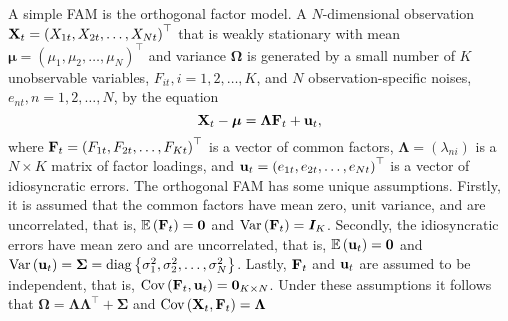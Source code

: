 A simple FAM is the orthogonal factor model. A $N$-dimensional observation ${\bf X}_t = \left( X_{1 t}, X_{2 t}, \ldots, X_{N t} \right)^{\top}$ that is weakly stationary with mean ${\bm \mu} = \left( \mu_1, \mu_2, \ldots, \mu_N \right)^{\top}$ and variance ${\bm \Omega}$ is generated by a small number of $K$ unobservable variables, $F_{i t}, i = 1, 2, \ldots, K$, and $N$ observation-specific noises, $e_{n t}, n = 1, 2, \ldots, N$, by the equation
\begin{equation}
	{\bf X}_t - {\bm \mu} = {\bm \Lambda} {\bf F}_t + {\bf u}_t \label{orthog.fa.model},
\end{equation}
where ${\bf F}_t = \left( F_{1 t}, F_{2 t}, \ldots, F_{K t} \right)^{\top}$ is a vector of common factors, ${\bm \Lambda} = \left( \lambda_{n i} \right)$ is a $N \times K$ matrix of factor loadings, and ${\bf u}_t = \left( e_{1 t}, e_{2 t}, \ldots, e_{N t} \right)^{\top}$ is a vector of idiosyncratic errors. 
The orthogonal FAM has some unique assumptions.
Firstly, it is assumed that the common factors have mean zero, unit variance, and are uncorrelated, that is, $\mathbb{E} \left( {\bf F}_t \right) = {\bm 0}$ and $\text{Var} \left( {\bf F}_t \right) = {\bm I}_K$.
Secondly, the idiosyncratic errors have mean zero and are uncorrelated, that is,  $\mathbb{E} \left( {\bf u}_t \right) = {\bm 0}$ and $\text{Var} \left( {\bf u}_t \right) = {\bm \Sigma} = \operatorname{diag} \left\{ \sigma_1^2, \sigma_2^2, \ldots, \sigma_N^2 \right\}$.
Lastly,  ${\bf F}_t$ and ${\bf u}_t$ are assumed to be independent, that is, $\text{Cov} \left( {\bf F}_t, {\bf u}_t \right) = {\bm 0}_{K \times N}$.
Under these assumptions it follows that ${\bm \Omega} = {\bm \Lambda} {\bm \Lambda}^{\top} + {\bm \Sigma}$ and $\text{Cov} \left( {\bf X}_t, {\bf F}_t \right) = {\bm \Lambda}$

